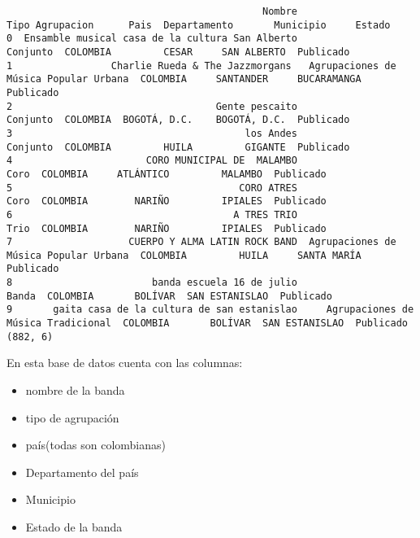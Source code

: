 \documentclass[11pt]{article}
\begin{document}
\begin{verbatim}
                                            Nombre                        Tipo Agrupacion      Pais  Departamento       Municipio     Estado
0  Ensamble musical casa de la cultura San Alberto                               Conjunto  COLOMBIA         CESAR     SAN ALBERTO  Publicado
1                 Charlie Rueda & The Jazzmorgans   Agrupaciones de Música Popular Urbana  COLOMBIA     SANTANDER     BUCARAMANGA  Publicado
2                                   Gente pescaito                               Conjunto  COLOMBIA  BOGOTÁ, D.C.    BOGOTÁ, D.C.  Publicado
3                                        los Andes                               Conjunto  COLOMBIA         HUILA         GIGANTE  Publicado
4                       CORO MUNICIPAL DE  MALAMBO                                   Coro  COLOMBIA     ATLÁNTICO         MALAMBO  Publicado
5                                       CORO ATRES                                   Coro  COLOMBIA        NARIÑO         IPIALES  Publicado
6                                      A TRES TRIO                                   Trio  COLOMBIA        NARIÑO         IPIALES  Publicado
7                    CUERPO Y ALMA LATIN ROCK BAND  Agrupaciones de Música Popular Urbana  COLOMBIA         HUILA     SANTA MARÍA  Publicado
8                        banda escuela 16 de julio                                  Banda  COLOMBIA       BOLÍVAR  SAN ESTANISLAO  Publicado
9       gaita casa de la cultura de san estanislao     Agrupaciones de Música Tradicional  COLOMBIA       BOLÍVAR  SAN ESTANISLAO  Publicado
(882, 6)
\end{verbatim}

En esta base de datos cuenta con las columnas:
\begin{itemize}
\item nombre de la banda
\item tipo de agrupación
\item país(todas son colombianas)
\item Departamento del país
\item Municipio
\item Estado de la banda
\end{itemize}
\end{document}
